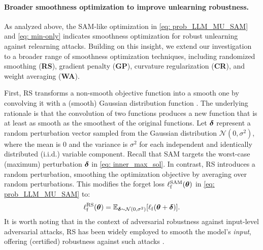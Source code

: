 \paragraph{Broader smoothness optimization to improve unlearning robustness.}
As analyzed above, the SAM-like optimization in \eqref{eq: prob_LLM_MU_SAM} and \eqref{eq: min-only} indicates smoothness optimization for robust unlearning against relearning attacks. Building on this insight, we extend our investigation to a broader range of smoothness optimization techniques, including randomized smoothing (\textbf{RS}), gradient penalty (\textbf{GP}), curvature regularization (\textbf{CR}), and weight averaging (\textbf{WA}).


First, RS transforms a non-smooth objective function into a smooth one by convolving it with a (smooth) Gaussian distribution function \citep{duchi2012randomized}.  The underlying rationale is that the convolution of two functions produces a new function that is at least as smooth as the smoothest of the original functions. Let $\boldsymbol\delta$ represent a random perturbation vector sampled from the Gaussian distribution $\mathcal{N}( 0, \sigma^2)$, where the mean is $0$ and the variance is $\sigma^2$ for each independent and identically distributed (i.i.d.) variable component.
Recall that SAM targets the worst-case (maximum) perturbation $\boldsymbol\delta$ in \eqref{eq: inner_max_sol}. In contrast, RS introduces a random perturbation, smoothing the optimization objective by averaging over random perturbations. This modifies the forget loss  $\ell^{\mathrm{SAM}}_{\mathrm{f}} ({\boldsymbol{\theta}})$ in \eqref{eq: prob_LLM_MU_SAM} to:
\begin{align}
    \ell^{\mathrm{RS}}_{\mathrm{f}} ({\boldsymbol{\theta}}) = \mathbb E_{\boldsymbol\delta \sim \mathcal N(0, \sigma^2)} [ \ell_{\mathrm{f}}(\boldsymbol{\theta} + \boldsymbol{\delta} )].
    \label{eq: SAM_RS}
\end{align}
It is worth noting that in the context of adversarial robustness against input-level adversarial attacks, RS has been widely employed to smooth the model's \textit{input}, offering (certified) robustness against such attacks \citep{cohen2019certified}.


